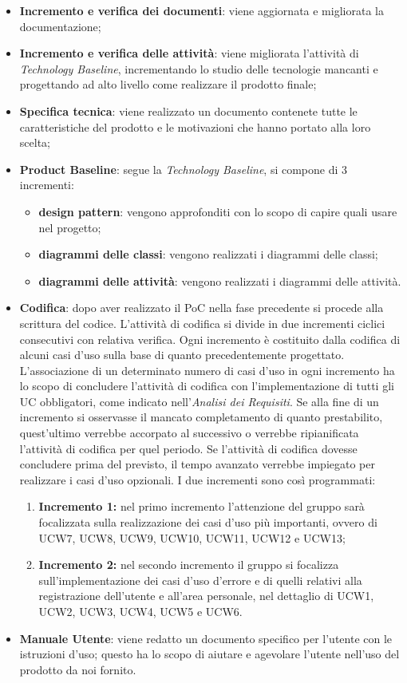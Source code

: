 \begin{itemize}
	\item \textbf{Incremento e verifica dei documenti}: viene aggiornata e migliorata la documentazione;
	\item \textbf{Incremento e verifica delle attività}: viene migliorata l’attività di \textit{Technology Baseline}\glo{},  incrementando lo studio delle tecnologie mancanti e progettando ad alto livello come realizzare il prodotto finale;
	\item \textbf{Specifica tecnica}: viene realizzato un documento contenete tutte le caratteristiche del prodotto e le motivazioni che hanno portato alla loro scelta;
	\item \textbf{Product Baseline}: segue la \textit{Technology Baseline},  si compone di 3 incrementi:
		\begin{itemize}
			\item \textbf{design pattern\glo{}}: vengono approfonditi con lo scopo di capire quali usare nel progetto;
			\item \textbf{diagrammi delle classi}: vengono realizzati i diagrammi delle classi;
			\item \textbf{diagrammi delle attività}: vengono realizzati i diagrammi delle attività.
		\end{itemize}
	\item \textbf{Codifica}: dopo aver realizzato il PoC nella fase precedente si procede alla scrittura del codice.  L'attività di codifica si divide in due incrementi ciclici consecutivi con relativa verifica.  Ogni incremento è costituito dalla codifica di alcuni casi d'uso\glo{} sulla base di quanto precedentemente progettato.  L’associazione di un determinato numero di casi d’uso in ogni incremento ha lo scopo di concludere l'attività di codifica con l’implementazione di tutti gli UC obbligatori,  come indicato nell'\textit{Analisi dei Requisiti}.  Se alla fine di un incremento si osservasse il mancato completamento di quanto prestabilito,  quest’ultimo verrebbe accorpato al successivo o verrebbe ripianificata l’attività di codifica per quel periodo.  Se l'attività di codifica dovesse concludere prima del previsto,  il tempo avanzato verrebbe impiegato per realizzare i casi d'uso opzionali.  I due incrementi sono così programmati:
		\begin{enumerate}
			\item \textbf{Incremento 1:} nel primo incremento l'attenzione del gruppo sarà focalizzata sulla realizzazione dei casi d'uso più importanti,  ovvero di UCW7,  UCW8,  UCW9,  UCW10,  UCW11,  UCW12 e UCW13;
			\item \textbf{Incremento 2:} nel secondo incremento il gruppo si focalizza sull'implementazione dei casi d'uso d'errore e di quelli relativi alla registrazione dell'utente e all'area personale,  nel dettaglio di UCW1,  UCW2,  UCW3,  UCW4,  UCW5 e UCW6.  
		\end{enumerate}
	\item \textbf{Manuale Utente}: viene redatto un documento specifico per l'utente con le istruzioni d'uso; questo ha lo scopo di aiutare e agevolare l’utente nell’uso del prodotto da noi fornito.
\end{itemize}

